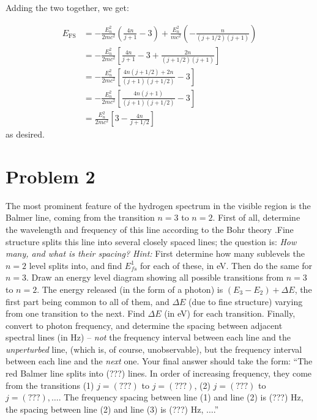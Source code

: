 \documentclass[10pt]{article}
\begin{document}
\begin{solution}
			Adding the two together, we get:

			\begin{align*}
				E_{\text{FS}} &= -\frac{E_n^2}{2mc^2}\left(\frac{4n}{j + 1} - 3\right) + \frac{E_n^2}{mc^2}\left(-\frac{n}{(j + 1/2)(j+1)}\right)\\
				&= -\frac{E_n^2}{2mc^2}\left[ \frac{4n}{j+1} - 3 + \frac{2n}{(j + 1/2)(j + 1)}\right]\\
				&= -\frac{E_n^2}{2mc^2}\left[ \frac{4n(j + 1/2) + 2n}{(j+1)(j + 1/2)} - 3\right]\\
				&= -\frac{E_n^2}{2mc^2}\left[\frac{4n(j + 1)}{(j+1)(j+1/2)} - 3\right]\\
				&= \frac{E_n^2}{2mc^2}\left[ 3 - \frac{4n}{j + 1/2}\right]
			\end{align*}
			as desired. 
		\end{solution}

		\pagebreak

		\section*{Problem 2}
		The most prominent feature of the hydrogen spectrum in the visible region is the Balmer line,
		coming from the transition $n=3$ to $n=2$. First of all, determine the wavelength and frequency
		of this line according to the Bohr theory .Fine structure splits this line into several closely
		spaced lines; the question is: \textit{How many, and what is their spacing? Hint:} First 
		determine how many sublevels the $n=2$ level splits into, and find $E_{fs}^1$ for each of 
		these, in eV. Then do the same for $n=3$. Draw an energy level diagram showing all possible
		transitions from $n=3$ to $n=2$. The energy released (in the form of a photon) is 
		$(E_3 - E_2) + \Delta E$, the first part being common to all of them, and $\Delta E$ (due to 
		fine structure) varying from one transition to the next. Find $\Delta E$ (in eV) for each 
		transition. Finally, convert to photon frequency, and determine the spacing between adjacent
		spectral lines (in Hz) -- \textit{not} the frequency interval between each line and the 
		\textit{unperturbed} line, (which is, of course, unobservable), but the frequency interval 
		between each line and the \textit{next} one. Your final answer should take the form: ``The red
		Balmer line splits into (???) lines. In order of increasing frequency, they come from the 
		transitions (1) $j = (???)$ to $j = (???)$, (2) $j = (???)$ to $j = (???), \dots$. The 
		frequency spacing between line (1) and line (2) is (???) Hz, the spacing between line (2) and 
		line (3) is (???) Hz, $\dots$.''
\end{document}

